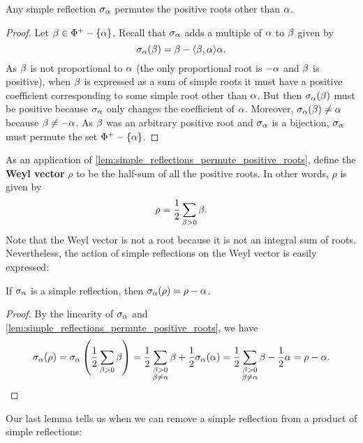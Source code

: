 \documentclass[12pt,reqno,oneside]{amsart}
\begin{document}
    \begin{lemma}\label{lem:simple_reflections_permute_positive_roots}
        Any simple reflection $\sigma_{\alpha}$ permutes the positive roots other than $\alpha$.
    \end{lemma}
    \begin{proof}
        Let $\beta \in \Phi^{+}-\{\alpha\}$. Recall that $\sigma_{\alpha}$ adds a multiple of $\alpha$ to $\beta$ given by
        \[
            \sigma_{\alpha}(\beta) = \beta-\langle\beta,\alpha\rangle\alpha.
        \]
        As $\beta$ is not proportional to $\alpha$ (the only proportional root is $-\alpha$ and $\beta$ is positive), when $\beta$ is expressed as a sum of simple roots it must have a positive coefficient corresponding to some simple root other than $\alpha$. But then $\sigma_{\alpha}(\beta)$ must be positive because $\sigma_{\alpha}$ only changes the coefficient of $\alpha$. Moreover, $\sigma_{\alpha}(\beta) \neq \alpha$ because $\beta \neq -\alpha$. As $\beta$ was an arbitrary positive root and $\sigma_{\alpha}$ is a bijection, $\sigma_{\alpha}$ must permute the set $\Phi^{+}-\{\alpha\}$.
    \end{proof}

    As an application of \cref{lem:simple_reflections_permute_positive_roots}, define the \textbf{Weyl vector} $\rho$ to be the half-sum of all the positive roots. In other words, $\rho$ is given by
    \[
        \rho = \frac{1}{2}\sum_{\beta > 0}\beta.
    \]
    Note that the Weyl vector is not a root because it is not an integral sum of roots. Nevertheless, the action of simple reflections on the Weyl vector is easily expressed:

    \begin{corollary}\label{cor:simple_reflection_on_half_sum_element}
        If $\sigma_{\alpha}$ is a simple reflection, then $\sigma_{\alpha}(\rho) = \rho-\alpha$.
    \end{corollary}
    \begin{proof}
        By the linearity of $\sigma_{\alpha}$ and \cref{lem:simple_reflections_permute_positive_roots}, we have
        \[
            \sigma_{\alpha}(\rho) = \sigma_{\alpha}\left(\frac{1}{2}\sum_{\beta > 0}\beta\right) = \frac{1}{2}\sum_{\substack{\beta > 0 \\ \beta \neq \alpha}}\beta+\frac{1}{2}\sigma_{\alpha}(\alpha) = \frac{1}{2}\sum_{\substack{\beta > 0 \\ \beta \neq \alpha}}\beta-\frac{1}{2}\alpha = \rho-\alpha.
        \]
    \end{proof}

    Our last lemma tells us when we can remove a simple reflection from a product of simple reflections:
\end{document}
